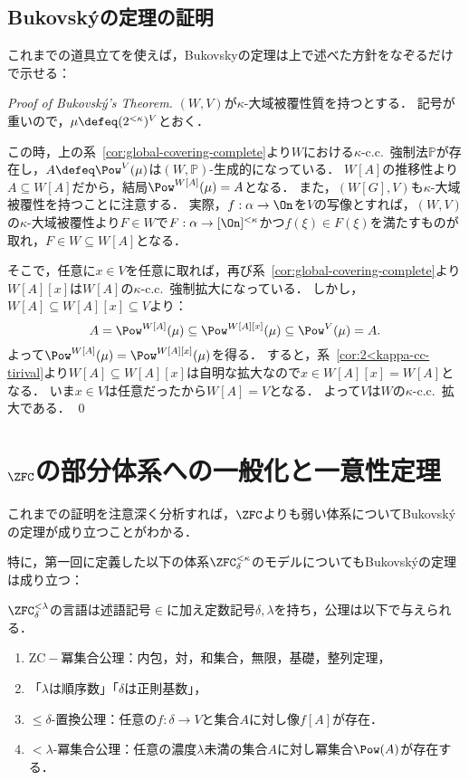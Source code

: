 \documentclass[a4j,leqno]{ltjsarticle}
\newcommand{\cc}{c.c.\ }
\begin{document}
\subsection{Bukovsk\'{y}の定理の証明}
これまでの道具立てを使えば，Bukovskyの定理は上で述べた方針をなぞるだけで示せる：
\begin{proof}[Proof of Bukovsk\'{y}'s Theorem]
 $(W, V)$が$\kappa$-大域被覆性質を持つとする．
 記号が重いので，$\mu \defeq (2^{<\kappa})^V$とおく．

 この時，上の系~\ref{cor:global-covering-complete}より$W$における$\kappa$-\cc{}強制法$\mathbb{P}$が存在し，$A \defeq \Pow^V(\mu)$は$(W, \mathbb{P})$-生成的になっている．
 $W[A]$の推移性より$A \subseteq W[A]$だから，結局$\Pow^{W[A]}(\mu) = A$となる．
 また，$(W[G], V)$も$\kappa$-大域被覆性を持つことに注意する．
 実際，$f: \alpha \to \On$を$V$の写像とすれば，$(W, V)$の$\kappa$-大域被覆性より$F \in W$で$F: \alpha \to [\On]^{<\kappa}$かつ$f(\xi) \in F(\xi)$を満たすものが取れ，$F \in W \subseteq W[A]$となる．

 そこで，任意に$x \in V$を任意に取れば，再び系~\ref{cor:global-covering-complete}より$W[A][x]$は$W[A]$の$\kappa$-\cc{}強制拡大になっている．
 しかし，$W[A] \subseteq W[A][x] \subseteq V$より：
 \[
 A = \Pow^{W[A]}(\mu) \subseteq \Pow^{W[A][x]}(\mu)  \subseteq \Pow^V(\mu) = A.
 \]
 よって$\Pow^{W[A]}(\mu) = \Pow^{W[A][x]}(\mu)$を得る．
 すると，系~\ref{cor:2<kappa-cc-tirival}より$W[A] \subseteq W[A][x]$は自明な拡大なので$x \in W[A][x] = W[A]$となる．
 いま$x \in V$は任意だったから$W[A] = V$となる．
 よって$V$は$W$の$\kappa$-\cc{}拡大である． \qed
\end{proof}

\section{$\ZFC$の部分体系への一般化と一意性定理}
これまでの証明を注意深く分析すれば，$\ZFC$よりも弱い体系についてBukovsk\'{y}の定理が成り立つことがわかる．

特に，第一回に定義した以下の体系$\ZFC^{<\kappa}_\delta$のモデルについてもBukovsk\'{y}の定理は成り立つ：
\begin{definition}[$\ZFC^{<\lambda}$]
 $\ZFC^{<\lambda}_\delta$の言語は述語記号$\in$に加え定数記号$\delta, \lambda$を持ち，公理は以下で与えられる．
 \begin{enumerate}
  \item $\mathrm{ZC}-$冪集合公理：内包，対，和集合，無限，基礎，整列定理，
  \item 「$\lambda$は順序数」「$\delta$は正則基数」，
  \item ${\leq}\delta$-置換公理：任意の$f: \delta \to V$と集合$A$に対し像$f[A]$が存在．
  \item ${<}\lambda$-冪集合公理：任意の濃度$\lambda$未満の集合$A$に対し冪集合$\Pow(A)$が存在する．
 \end{enumerate}
\end{definition}
\end{document}

